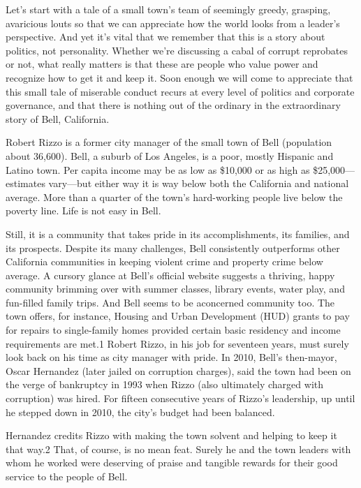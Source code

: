 \documentclass[10pt]{article}
\begin{document}
{\large Let's start with a tale of a small town's team of seemingly greedy,
grasping, avaricious louts so that we can appreciate how the world looks from a
leader's perspective. And yet it's vital that we remember that this is a story
about politics, not personality. Whether we're discussing a cabal of corrupt
reprobates or not, what really matters is that these are people who value power
and recognize how to get it and keep it. Soon enough we will come to appreciate
that this small tale of miserable conduct recurs at every level of politics and
corporate governance, and that there is nothing out of the ordinary in the
extraordinary story of Bell, California.}

{\large Robert Rizzo is a former city manager of the small town of Bell
(population about 36,600). Bell, a suburb of Los Angeles, is a poor, mostly
Hispanic and Latino town. Per capita income may be as low as \$10,000 or as high
as \$25,000---estimates vary---but either way it is way below both the California
and national average. More than a quarter of the town's hard-working people live
below the poverty line. Life is not easy in Bell.}

{\large Still, it is a community that takes pride in its accomplishments, its
families, and its prospects. Despite its many challenges, Bell consistently
outperforms other California communities in keeping violent crime and property
crime below average. A cursory glance at Bell's official website suggests a
thriving, happy community brimming over with summer classes, library events,
water play, and fun-filled family trips. And Bell seems to be aconcerned
community too. The town offers, for instance, Housing and Urban Development (HUD)
grants to pay for repairs to single-family homes provided certain basic residency
and income requirements are met.1 Robert Rizzo, in his job for seventeen years,
must surely look back on his time as city manager with pride. In 2010, Bell's
then-mayor, Oscar Hernandez (later jailed on corruption charges), said the town
had been on the verge of bankruptcy in 1993 when Rizzo (also ultimately charged
with corruption) was hired. For fifteen consecutive years of Rizzo's leadership,
up until he stepped down in 2010, the city's budget had been balanced.}

{\large Hernandez credits Rizzo with making the town solvent and helping to keep
it that way.2 That, of course, is no mean feat. Surely he and the town leaders
with whom he worked were deserving of praise and tangible rewards for their good
service to the people of Bell.}
\end{document}
